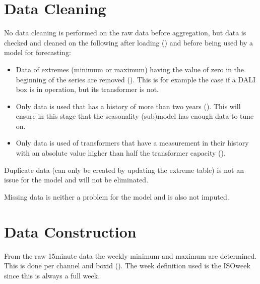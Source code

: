 \documentclass[letterpaper,10pt,english]{sphinxmanual}
\begin{document}
\section{Data Cleaning}
\label{\detokenize{data_preparation:data-cleaning}}
No data cleaning is performed on the raw data before aggregation, but data is checked and cleaned on the following after loading ({\hyperref[\detokenize{autoapi/src/preprocess/preprocess/index:src.preprocess.preprocess.load_data}]{}}) and before being used by a model for forecasting:
\begin{itemize}
\item {} 
Data of extremes (minimum or maximum) having the value of zero in the beginning of the series are removed ({\hyperref[\detokenize{autoapi/src/preprocess/preprocess/index:src.preprocess.preprocess.remove_leading_idling}]{}}). This is for example the case if a DALI box is in operation, but its transformer is not.

\item {} 
Only data is used that has a history of more than two years ({\hyperref[\detokenize{autoapi/src/preprocess/preprocess/index:src.preprocess.preprocess.too_short}]{}}). This will ensure in this stage that the seasonality (sub)model has enough data to tune on.

\item {} 
Only data is used of transformers that have a measurement in their history with an absolute value higher than half the transformer capacity ({\hyperref[\detokenize{autoapi/src/preprocess/preprocess/index:src.preprocess.preprocess.too_small}]{}}).

\end{itemize}

Duplicate data (can only be created by updating the extreme table) is not an issue for the model and will not be eliminated.

Missing data is neither a problem for the model and is also not imputed.


\section{Data Construction}
\label{\detokenize{data_preparation:data-construction}}
From the raw 15\sphinxhyphen{}minute data the weekly minimum and maximum are determined. This is done per channel and boxid ({\hyperref[\detokenize{autoapi/src/utils/snowflake/index:src.utils.snowflake.make_week_extremes_query}]{}}).
The week definition used is the ISO\sphinxhyphen{}week since this is always a full week.
\end{document}
